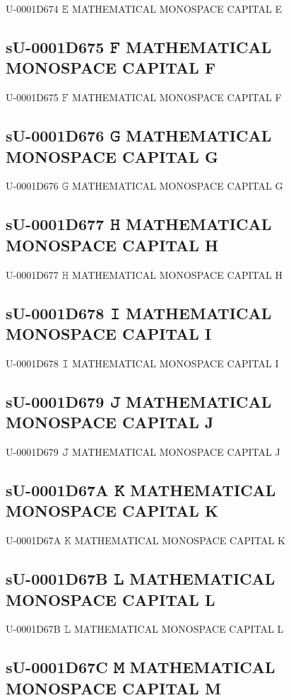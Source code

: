 U-0001D674 𝙴 MATHEMATICAL MONOSPACE CAPITAL E

\subsection{sU-0001D675 𝙵 MATHEMATICAL MONOSPACE CAPITAL F}

U-0001D675 𝙵 MATHEMATICAL MONOSPACE CAPITAL F

\subsection{sU-0001D676 𝙶 MATHEMATICAL MONOSPACE CAPITAL G}

U-0001D676 𝙶 MATHEMATICAL MONOSPACE CAPITAL G

\subsection{sU-0001D677 𝙷 MATHEMATICAL MONOSPACE CAPITAL H}

U-0001D677 𝙷 MATHEMATICAL MONOSPACE CAPITAL H

\subsection{sU-0001D678 𝙸 MATHEMATICAL MONOSPACE CAPITAL I}

U-0001D678 𝙸 MATHEMATICAL MONOSPACE CAPITAL I

\subsection{sU-0001D679 𝙹 MATHEMATICAL MONOSPACE CAPITAL J}

U-0001D679 𝙹 MATHEMATICAL MONOSPACE CAPITAL J

\subsection{sU-0001D67A 𝙺 MATHEMATICAL MONOSPACE CAPITAL K}

U-0001D67A 𝙺 MATHEMATICAL MONOSPACE CAPITAL K

\subsection{sU-0001D67B 𝙻 MATHEMATICAL MONOSPACE CAPITAL L}

U-0001D67B 𝙻 MATHEMATICAL MONOSPACE CAPITAL L

\subsection{sU-0001D67C 𝙼 MATHEMATICAL MONOSPACE CAPITAL M}

